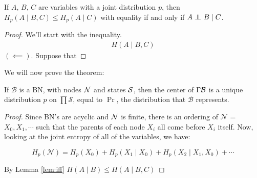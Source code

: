 \documentclass{article}
\begin{document}
	\begin{lemma}
		If $A$, $B$, $C$ are variables with a joint distribution $p$, then $H_p(A \mid B, C) \leq H_p(A \mid C)$ with equality if and only if $A \mathrel{\perp\mspace{-10mu}\perp} B \mid C$.
	\end{lemma}
	\begin{proof}
		We'll start with the inequality. 
		\begin{align*}
			H(A \mid B, C) 
		\end{align*}
		$(\impliedby)$. Suppose that 
	\end{proof}
	
	We will now prove the theorem:
	\begin{theorem}
		If $\mathcal B$ is a BN, with nodes $\cal N$ and states $\cal S$, then the center of $\Gamma\cal B$ is a unique distribution $p$ on $\prod \mathcal S$, equal to $\Pr$, the distribution that $\mathcal B$ represents.
	\end{theorem}
	\begin{proof}
		Since BN's are acyclic and $\cal N$ is finite, there is an ordering of $\mathcal N$ = $X_0, X_1, \cdots$ such that the parents of each node $X_i$ all come before $X_i$ itself. Now, looking at the joint entropy of all of the variables, we have:
		
		\[	H_p(\mathcal N) = H_p(X_0) + H_p(X_1 \mid X_0) + H_p(X_2 \mid X_1, X_0) + \cdots \]
		
		By Lemma \ref{lem:iff} $H(A\mid B) \leq H(A \mid B, C)$
	\end{proof}
		
	
\end{document}
